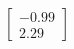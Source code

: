 \documentclass[preview]{standalone}
\begin{document}
\begin{align*}
\begin{bmatrix} -0.99 \\ 2.29 \end{bmatrix}
\end{align*}
\end{document}
